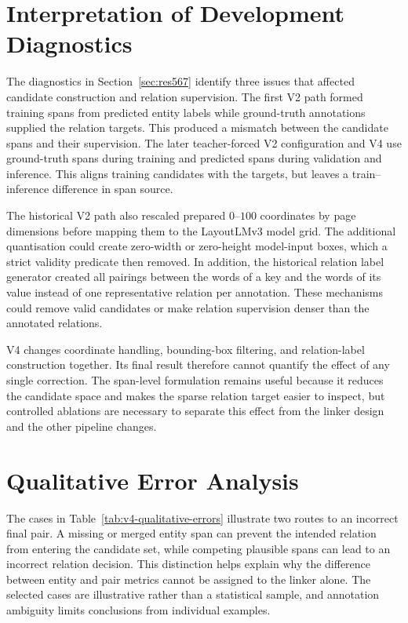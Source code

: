 \section{Interpretation of Development Diagnostics}
\label{sec:root-cause-analysis}

The diagnostics in Section~\ref{sec:res567} identify three issues that affected
candidate construction and relation supervision. The first V2 path formed
training spans from predicted entity labels while ground-truth annotations
supplied the relation targets. This produced a mismatch between the candidate
spans and their supervision. The later teacher-forced V2 configuration and V4
use ground-truth spans during training and predicted spans during validation
and inference. This aligns training candidates with the targets, but leaves a
train--inference difference in span source.

The historical V2 path also rescaled prepared $0$--$100$ coordinates by page
dimensions before mapping them to the LayoutLMv3 model grid. The additional
quantisation could create zero-width or zero-height model-input boxes, which a
strict validity predicate then removed. In addition, the historical relation
label generator created all pairings between the words of a key and the words
of its value instead of one representative relation per annotation. These
mechanisms could remove valid candidates or make relation supervision denser
than the annotated relations.

V4 changes coordinate handling, bounding-box filtering, and relation-label
construction together. Its final result therefore cannot quantify the effect
of any single correction. The span-level formulation remains useful because
it reduces the candidate space and makes the sparse relation target easier to
inspect, but controlled ablations are necessary to separate this effect from
the linker design and the other pipeline changes.

\section{Qualitative Error Analysis}
\label{sec:error_analysis}

The cases in Table~\ref{tab:v4-qualitative-errors} illustrate two routes to an
incorrect final pair. A missing or merged entity span can prevent the intended
relation from entering the candidate set, while competing plausible spans can
lead to an incorrect relation decision. This distinction helps explain why
the difference between entity and pair metrics cannot be assigned to the
linker alone. The selected cases are illustrative rather than a statistical
sample, and annotation ambiguity limits conclusions from individual examples.

